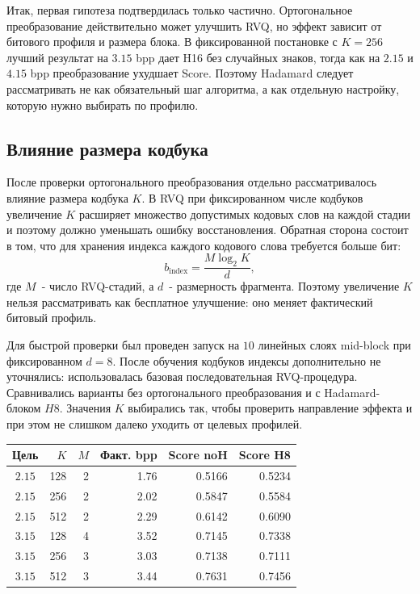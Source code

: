 \documentclass[a4paper,12pt]{article}
\begin{document}
Итак, первая гипотеза подтвердилась только частично. Ортогональное преобразование действительно может улучшить RVQ, но эффект зависит от битового профиля и размера блока. В фиксированной постановке с $K=256$ лучший результат на $3.15$ bpp дает H16 без случайных знаков, тогда как на $2.15$ и $4.15$ bpp преобразование ухудшает Score. Поэтому Hadamard следует рассматривать не как обязательный шаг алгоритма, а как отдельную настройку, которую нужно выбирать по профилю.

\subsection{Влияние размера кодбука}

После проверки ортогонального преобразования отдельно рассматривалось влияние размера кодбука $K$. В RVQ при фиксированном числе кодбуков увеличение $K$ расширяет множество допустимых кодовых слов на каждой стадии и поэтому должно уменьшать ошибку восстановления. Обратная сторона состоит в том, что для хранения индекса каждого кодового слова требуется больше бит:
\[
    b_{\mathrm{index}}
    =
    \frac{M \log_2 K}{d},
\]
где $M$~- число RVQ-стадий, а $d$~- размерность фрагмента. Поэтому увеличение $K$ нельзя рассматривать как бесплатное улучшение: оно меняет фактический битовый профиль.

Для быстрой проверки был проведен запуск на $10$ линейных слоях mid-block при фиксированном $d=8$. После обучения кодбуков индексы дополнительно не уточнялись: использовалась базовая последовательная RVQ-процедура. Сравнивались варианты без ортогонального преобразования и с Hadamard-блоком $H8$. Значения $K$ выбирались так, чтобы проверить направление эффекта и при этом не слишком далеко уходить от целевых профилей.

\begin{center}
\small
\begin{tabular}{crrrrr}
\hline
Цель & $K$ & $M$ & Факт. bpp & Score noH & Score H8 \\
\hline
$2.15$ & 128 & 2 & 1.76 & 0.5166 & 0.5234 \\
$2.15$ & 256 & 2 & 2.02 & 0.5847 & 0.5584 \\
$2.15$ & 512 & 2 & 2.29 & 0.6142 & 0.6090 \\
$3.15$ & 128 & 4 & 3.52 & 0.7145 & 0.7338 \\
$3.15$ & 256 & 3 & 3.03 & 0.7138 & 0.7111 \\
$3.15$ & 512 & 3 & 3.44 & 0.7631 & 0.7456 \\
\hline
\end{tabular}
\end{center}
\end{document}
